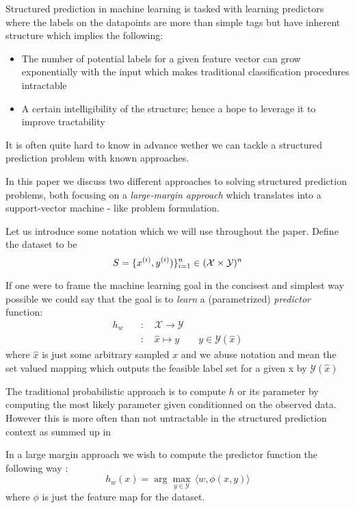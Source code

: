 Structured prediction in machine learning is tasked with learning
predictors where the labels on the datapoints are more than simple
tags but have inherent structure which implies the following:
\begin{itemize}
\item The number of potential labels for a given feature vector
  can grow exponentially with the input which makes traditional
  classification procedures intractable
\item A certain intelligibility of the structure; hence a hope to
  leverage it to improve tractability
\end{itemize}
It is often quite hard to know in advance wether we can tackle a structured
prediction problem with known approaches.

In this paper we discuss two different approaches to solving structured
prediction problems, both focusing on a \emph{large-margin approach} which
translates into a support-vector machine - like problem formulation.

Let us introduce some notation which we will use throughout the paper.
Define the dataset to be
\begin{equation}
  S = \{ x^{(i)}, y^{(i)}) \}_{i=1}^{n} \in (\mathcal X \times \mathcal Y)^{n} \label{intro:eq:dataset}
\end{equation}

If one were to frame the machine learning goal in the concisest and simplest way
possible we could say that the goal is to \emph{learn} a (parametrized) \emph{predictor}
function:
\begin{align*}
  h_w \quad & : \quad  \mathcal{X} \rightarrow \mathcal Y\\
  &: \quad \hat x \mapsto y \qquad y\in \mathcal{Y} (\hat x)
\end{align*}
where $\hat x$ is just some arbitrary sampled $x$ and we abuse notation and mean
the set valued mapping which outputs the feasible label set for a given x by
$\mathcal Y(\hat x)$

The traditional probabilistic approach is to compute $h$ or its parameter by
computing the most likely parameter given conditionned on the observed data.
However this is more often than not untractable in the structured prediction
context as summed up in \citet{taskarStructuredPredictionDual2006}

In a large margin approach we wish to compute the predictor
function the following way :
\begin{equation}
  h_{w}(x)= \arg\max_{y\in \mathcal Y} \, \langle w, \phi(x,y)\rangle
\end{equation}
where $\phi$ is just the feature map for the dataset.

